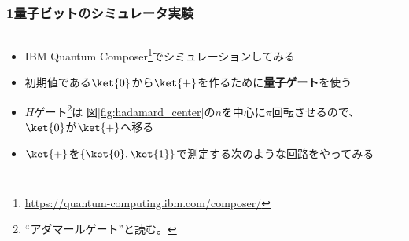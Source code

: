 \begin{frame}
  \frametitle{1量子ビットのシミュレータ実験}

  \pause
  \begin{columns}
    \begin{column}{0.6\textwidth}
      \begin{itemize}
        \item<+-> IBM Quantum Composer\footnote{\url{https://quantum-computing.ibm.com/composer/}}でシミュレーションしてみる

        \item<+-> 初期値である$\ket{0}$から$\ket{+}$を作るために\textbf{量子ゲート}を使う

        \item<+-> $H$ゲート\footnote{``アダマールゲート''と読む。}は
        図\ref{fig:hadamard_center}の$n$を中心に$\pi$回転させるので、
        $\ket{0}$が$\ket{+}$へ移る

        \item<+-> $\ket{+}$を$\left\{\ket{0}, \ket{1}\right\}$で測定する次のような回路をやってみる
        \begin{figure}
          \centering
        \end{figure}
      \end{itemize}
    \end{column}
    \begin{column}{0.4\textwidth}
    \end{column}
  \end{columns}
\end{frame}

